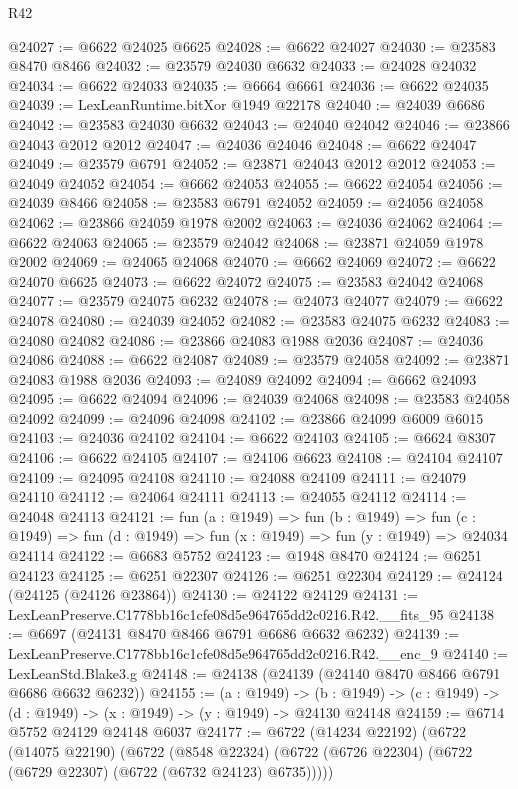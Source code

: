 \begin{lexlean}{R42}
\begin{coremodule}
{@24027 := @6622 @24025 @6625
@24028 := @6622 @24027
@24030 := @23583 @8470 @8466
@24032 := @23579 @24030 @6632
@24033 := @24028 @24032
@24034 := @6622 @24033
@24035 := @6664 @6661
@24036 := @6622 @24035
@24039 := LexLeanRuntime.bitXor @1949 @22178
@24040 := @24039 @6686
@24042 := @23583 @24030 @6632
@24043 := @24040 @24042
@24046 := @23866 @24043 @2012 @2012
@24047 := @24036 @24046
@24048 := @6622 @24047
@24049 := @23579 @6791
@24052 := @23871 @24043 @2012 @2012
@24053 := @24049 @24052
@24054 := @6662 @24053
@24055 := @6622 @24054
@24056 := @24039 @8466
@24058 := @23583 @6791 @24052
@24059 := @24056 @24058
@24062 := @23866 @24059 @1978 @2002
@24063 := @24036 @24062
@24064 := @6622 @24063
@24065 := @23579 @24042
@24068 := @23871 @24059 @1978 @2002
@24069 := @24065 @24068
@24070 := @6662 @24069
@24072 := @6622 @24070 @6625
@24073 := @6622 @24072
@24075 := @23583 @24042 @24068
@24077 := @23579 @24075 @6232
@24078 := @24073 @24077
@24079 := @6622 @24078
@24080 := @24039 @24052
@24082 := @23583 @24075 @6232
@24083 := @24080 @24082
@24086 := @23866 @24083 @1988 @2036
@24087 := @24036 @24086
@24088 := @6622 @24087
@24089 := @23579 @24058
@24092 := @23871 @24083 @1988 @2036
@24093 := @24089 @24092
@24094 := @6662 @24093
@24095 := @6622 @24094
@24096 := @24039 @24068
@24098 := @23583 @24058 @24092
@24099 := @24096 @24098
@24102 := @23866 @24099 @6009 @6015
@24103 := @24036 @24102
@24104 := @6622 @24103
@24105 := @6624 @8307
@24106 := @6622 @24105
@24107 := @24106 @6623
@24108 := @24104 @24107
@24109 := @24095 @24108
@24110 := @24088 @24109
@24111 := @24079 @24110
@24112 := @24064 @24111
@24113 := @24055 @24112
@24114 := @24048 @24113
@24121 := fun (a : @1949) =>
  fun (b : @1949) =>
  fun (c : @1949) => fun (d : @1949) => fun (x : @1949) => fun (y : @1949) => @24034 @24114
@24122 := @6683 @5752
@24123 := @1948 @8470
@24124 := @6251 @24123
@24125 := @6251 @22307
@24126 := @6251 @22304
@24129 := @24124 (@24125 (@24126 @23864))
@24130 := @24122 @24129
@24131 := LexLeanPreserve.C1778bb16c1cfe08d5e964765dd2c0216.R42.__fits_95
@24138 := @6697 (@24131 @8470 @8466 @6791 @6686 @6632 @6232)
@24139 := LexLeanPreserve.C1778bb16c1cfe08d5e964765dd2c0216.R42.__enc_9
@24140 := LexLeanStd.Blake3.g
@24148 := @24138 (@24139 (@24140 @8470 @8466 @6791 @6686 @6632 @6232))
@24155 := (a : @1949) ->
  (b : @1949) -> (c : @1949) -> (d : @1949) -> (x : @1949) -> (y : @1949) -> @24130 @24148
@24159 := @6714 @5752 @24129 @24148 @6037
@24177 := @6722
    (@14234 @22192)
    (@6722
      (@14075 @22190)
      (@6722
        (@8548 @22324)
        (@6722 (@6726 @22304) (@6722 (@6729 @22307) (@6722 (@6732 @24123) @6735)))))
}
\end{coremodule}
\end{lexlean}
